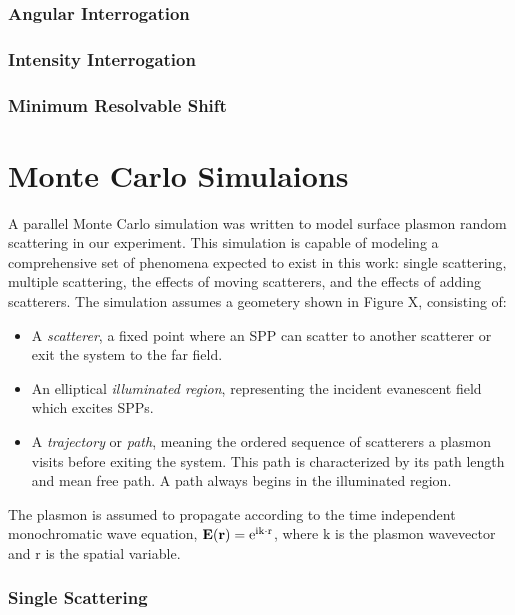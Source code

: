 \documentclass[a4paper,titlepage,onecolumn]{report}
\begin{document}
\subsection{Angular Interrogation}
\subsection{Intensity Interrogation}
\subsection{Minimum Resolvable Shift}

\chapter{Monte Carlo Simulaions}
A parallel Monte Carlo simulation was written to model surface plasmon
random scattering in our experiment. This simulation is capable of modeling
a comprehensive set of phenomena expected to exist in this work: single
scattering, multiple scattering, the effects of moving scatterers, and the
effects of adding scatterers. The simulation assumes a geometery shown in
Figure X, consisting of:

\begin{itemize}

\item A \textit{scatterer}, a fixed point where an SPP can scatter to
another scatterer or exit the system to the far field.

\item An elliptical \textit{illuminated region}, representing the incident
evanescent field which excites SPPs.

\item A \textit{trajectory} or \textit{path}, meaning the ordered sequence
of scatterers a plasmon visits before exiting the system. This path is
characterized by its path length and mean free path. A path always begins
in the illuminated region.

\end{itemize}

The plasmon is assumed to propagate according to the time independent
monochromatic wave equation, $\mathbf{E}(\mathbf{r})={\mathrm{e}}^{{\mathrm{i}}
\mathrm{k}\cdot \mathrm{r}}$, where $\mathrm{k}$ is the plasmon wavevector
and $\mathrm{r}$ is the spatial variable.

\subsection{Single Scattering}
\end{document}
